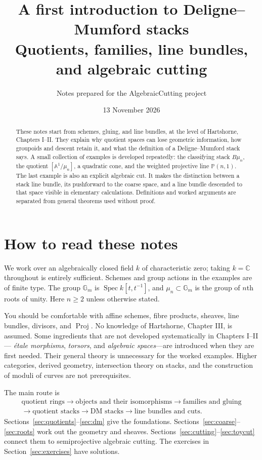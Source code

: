 \documentclass[11pt,a4paper]{article}
\title{A first introduction to Deligne--Mumford stacks\\[5pt]
\large Quotients, families, line bundles, and algebraic cutting}
\author{Notes prepared for the AlgebraicCutting project}
\date{13 November 2026}
\numberwithin{equation}{section}
\theoremstyle{definition}
\newcommand{\A}{\mathbb A}
\newcommand{\PP}{\mathbb P}
\newcommand{\Gm}{\mathbb G_m}
\newcommand{\Spec}{\operatorname{Spec}}
\newcommand{\Proj}{\operatorname{Proj}}
\begin{document}
\maketitle
\begin{abstract}
These notes start from schemes, gluing, and line bundles, at the level of
Hartshorne, Chapters I--II. They explain why quotient spaces can lose geometric
information, how groupoids and descent retain it, and what the definition of a
Deligne--Mumford stack says. A small collection of examples is developed repeatedly:
the classifying stack $B\mu_n$, the quotient $[\A^1/\mu_n]$, a quadratic cone,
and the weighted projective line $\PP(n,1)$. The last example is also an explicit
algebraic cut. It makes the distinction between a stack line bundle, its
pushforward to the coarse space, and a line bundle descended to that space visible
in elementary calculations. Definitions and worked arguments are separated from
general theorems used without proof.
\end{abstract}
\tableofcontents
\newpage

\section{How to read these notes}
\label{sec:reading}

We work over an algebraically closed field $k$ of characteristic zero; taking
$k=\mathbb C$ throughout is entirely sufficient. Schemes and group actions in the
examples are of finite type. The group $\Gm$ is $\Spec k[t,t^{-1}]$, and
$\mu_n\subset\Gm$ is the group of $n$th roots of unity. Here $n\geq2$ unless
otherwise stated.

You should be comfortable with affine schemes, fibre products, sheaves, line
bundles, divisors, and $\Proj$. No knowledge of Hartshorne, Chapter III, is assumed.
Some ingredients that are not developed systematically in Chapters I--II---
\emph{étale morphisms}, \emph{torsors}, and \emph{algebraic spaces}---are introduced
when they are first needed. Their general theory is unnecessary for the worked
examples. Higher categories, derived geometry, intersection theory on stacks, and
the construction of moduli of curves are not prerequisites.

The main route is
\[
\begin{gathered}
\text{quotient rings}\longrightarrow\text{objects and their isomorphisms}
\longrightarrow\text{families and gluing}\\
\longrightarrow\text{quotient stacks}\longrightarrow\text{DM stacks}
\longrightarrow\text{line bundles and cuts}.
\end{gathered}
\]
Sections~\ref{sec:quotients}--\ref{sec:dm} give the foundations.
Sections~\ref{sec:coarse}--\ref{sec:roots} work out the geometry and sheaves.
Sections~\ref{sec:cutting}--\ref{sec:toycut} connect them to semiprojective
algebraic cutting. The exercises in Section~\ref{sec:exercises} have solutions.
\end{document}
